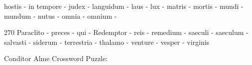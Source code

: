 \documentclass[12pt]{article}
\begin{document}
\pagestyle{fancy}
\fancyhf{}
\renewcommand{\headrulewidth}{0pt} %
  \renewcommand{\footrulewidth}{0pt}
\libertine
\renewcommand\PuzzleClueFont{\rm\normalsize}
\noindent\begin{rotate}{0}\small hostis -  in tempore -  judex -  languidum -  laus -  lux -  matris -  mortis -  mundi -  mundum -  nutus -  omnia -  omnium -
\end{rotate}
\hfill
\begin{rotate}{270}
\small Paraclito - preces -  qui -  Redemptor -  reis -  remedium -  saeculi -  saeculum -  salvasti -  siderum -  terrestria -  thalamo -  venture -  vesper -  virginis
\end{rotate}
\begin{center}
  \huge{Conditor Alme Crossword Puzzle:}
\end{center}
\vspace{1em}
\end{document}
